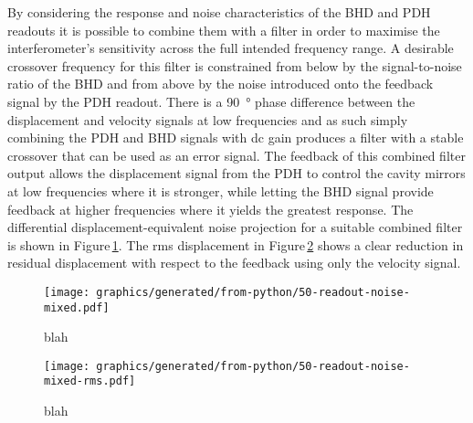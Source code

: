By considering the response and noise characteristics of the \gls{BHD} and \gls{PDH} readouts it is possible to combine them with a filter in order to maximise the interferometer's sensitivity across the full intended frequency range. A desirable crossover frequency for this filter is constrained from below by the signal-to-noise ratio of the \gls{BHD} and from above by the noise introduced onto the feedback signal by the \gls{PDH} readout. There is a \SI{90}{\degree} phase difference between the displacement and velocity signals at low frequencies and as such simply combining the \gls{PDH} and \gls{BHD} signals with dc gain produces a filter with a stable crossover that can be used as an error signal. The feedback of this combined filter output allows the displacement signal from the \gls{PDH} to control the cavity mirrors at low frequencies where it is stronger, while letting the \gls{BHD} signal provide feedback at higher frequencies where it yields the greatest response. The differential displacement-equivalent noise projection for a suitable combined filter is shown in Figure\,\ref{fig:readout-noise-mixed}. The rms displacement in Figure\,\ref{fig:readout-noise-mixed-rms} shows a clear reduction in residual displacement with respect to the feedback using only the velocity signal.

\begin{figure}
  \centering
  \texttt{[image: graphics/generated/from-python/50-readout-noise-mixed.pdf]}
  \caption{\label{fig:readout-noise-mixed}blah}
\end{figure}

\begin{figure}
  \centering
  \texttt{[image: graphics/generated/from-python/50-readout-noise-mixed-rms.pdf]}
  \caption{\label{fig:readout-noise-mixed-rms}blah}
\end{figure}


